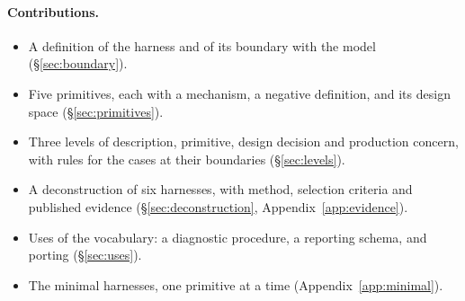 \paragraph{Contributions.}
\begin{itemize}
  \item A definition of the harness and of its boundary with the model (\S\ref{sec:boundary}).
  \item Five primitives, each with a mechanism, a negative definition, and its design space (\S\ref{sec:primitives}).
  \item Three levels of description, primitive, design decision and production concern, with rules for the cases at their boundaries (\S\ref{sec:levels}).
  \item A deconstruction of six harnesses, with method, selection criteria and published evidence (\S\ref{sec:deconstruction}, Appendix~\ref{app:evidence}).
  \item Uses of the vocabulary: a diagnostic procedure, a reporting schema, and porting (\S\ref{sec:uses}).
  \item The minimal harnesses, one primitive at a time (Appendix~\ref{app:minimal}).
\end{itemize}
